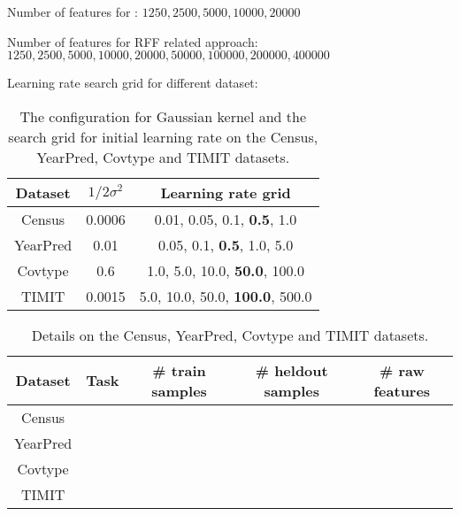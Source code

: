 Number of features for \Nystrom: $1250, 2500, 5000, 10000, 20000$

Number of features for RFF related approach: $1250, 2500, 5000, 10000, 20000, 50000, 100000, 200000, 400000$


Learning rate search grid for different dataset: 

\begin{table}
	\centering
	\begin{tabular}{c | c | c}
	\hline
	Dataset & $1/2\sigma^2$ & Learning rate grid \\
	\hline
	\hline
Census & 0.0006 & {0.01, 0.05, 0.1, \textbf{0.5}, 1.0} \\
YearPred & 0.01 & {0.05, 0.1, \textbf{0.5}, 1.0, 5.0} \\
Covtype & 0.6 & {1.0, 5.0, 10.0, \textbf{50.0}, 100.0} \\
TIMIT & 0.0015 & {5.0, 10.0, 50.0, \textbf{100.0}, 500.0} \\
	\hline
	\end{tabular}
	\caption{The configuration for Gaussian kernel and the search grid for initial learning rate on the Census, YearPred, Covtype and TIMIT datasets.}
	\label{tab:hyperparam}
\end{table}

\begin{table}
\centering
	\begin{tabular}{c | c | c | c | c }
	\hline
		Dataset & Task & \# train samples & \# heldout samples & \# raw features \\
	\hline
	\hline
		Census & & & & \\
		YearPred & & & & \\
		Covtype & & & &\\
		TIMIT & & & & \\
	\hline
	\end{tabular}
	\caption{Details on the Census, YearPred, Covtype and TIMIT datasets.}
	\label{tab:datasets}
\end{table}


